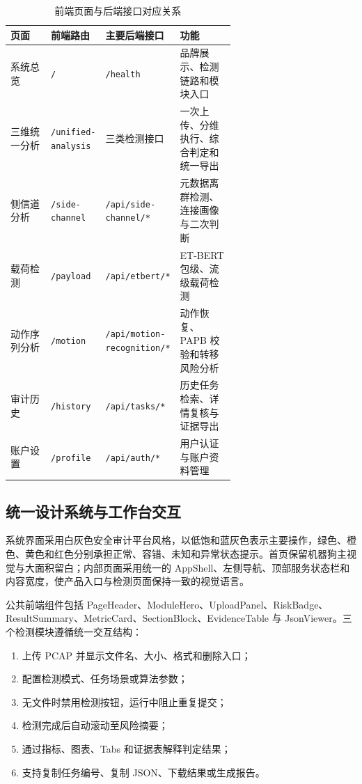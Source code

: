 \begin{table}[H]
\centering
\caption{前端页面与后端接口对应关系}
\label{tab:frontend_backend_routes}
\small
\begin{tabularx}{\linewidth}{p{0.18\linewidth}p{0.19\linewidth}p{0.27\linewidth}X}
\toprule
\textbf{页面} & \textbf{前端路由} & \textbf{主要后端接口} & \textbf{功能} \\
\midrule
系统总览 & \texttt{/} & \texttt{/health} & 品牌展示、检测链路和模块入口 \\
三维统一分析 & \texttt{/unified-analysis} & 三类检测接口 & 一次上传、分维执行、综合判定和统一导出 \\
侧信道分析 & \texttt{/side-channel} & \texttt{/api/side-channel/*} & 元数据离群检测、连接画像与二次判断 \\
载荷检测 & \texttt{/payload} & \texttt{/api/etbert/*} & ET-BERT 包级、流级载荷检测 \\
动作序列分析 & \texttt{/motion} & \texttt{/api/motion-recognition/*} & 动作恢复、PAPB 校验和转移风险分析 \\
审计历史 & \texttt{/history} & \texttt{/api/tasks/*} & 历史任务检索、详情复核与证据导出 \\
账户设置 & \texttt{/profile} & \texttt{/api/auth/*} & 用户认证与账户资料管理 \\
\bottomrule
\end{tabularx}
\end{table}

\subsection{统一设计系统与工作台交互}
\label{subsec:ui_workbench}

系统界面采用白灰色安全审计平台风格，以低饱和蓝灰色表示主要操作，绿色、橙色、黄色和红色分别承担正常、容错、未知和异常状态提示。首页保留机器狗主视觉与大面积留白；内部页面采用统一的 AppShell、左侧导航、顶部服务状态栏和内容宽度，使产品入口与检测页面保持一致的视觉语言。

公共前端组件包括 PageHeader、ModuleHero、UploadPanel、RiskBadge、ResultSummary、MetricCard、SectionBlock、EvidenceTable 与 JsonViewer。三个检测模块遵循统一交互结构：

\begin{enumerate}
    \item 上传 PCAP 并显示文件名、大小、格式和删除入口；
    \item 配置检测模式、任务场景或算法参数；
    \item 无文件时禁用检测按钮，运行中阻止重复提交；
    \item 检测完成后自动滚动至风险摘要；
    \item 通过指标、图表、Tabs 和证据表解释判定结果；
    \item 支持复制任务编号、复制 JSON、下载结果或生成报告。
\end{enumerate}

